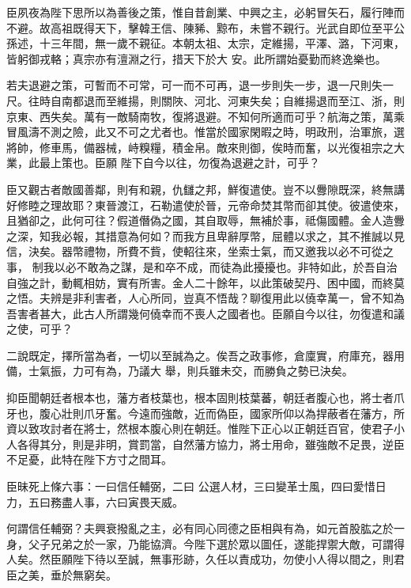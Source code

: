 \begin{pinyinscope}
 臣夙夜為陛下思所以為善後之策，惟自昔創業、中興之主，必躬冒矢石，履行陣而不避。故高祖既得天下，擊韓王信、陳豨、黥布，未嘗不親行。光武自即位至平公孫述，十三年間，無一歲不親征。本朝太祖、太宗，定維揚，平澤、潞，下河東，皆躬御戎輅；真宗亦有澶淵之行，措天下於大
 安。此所謂始憂勤而終逸樂也。



 若夫退避之策，可暫而不可常，可一而不可再，退一步則失一步，退一尺則失一尺。往時自南都退而至維揚，則關陜、河北、河東失矣；自維揚退而至江、浙，則京東、西失矣。萬有一敵騎南牧，復將退避。不知何所適而可乎？航海之策，萬乘冒風濤不測之險，此又不可之尤者也。惟當於國家閑暇之時，明政刑，治軍旅，選將帥，修車馬，備器械，峙糗糧，積金帛。敵來則御，俟時而奮，以光復祖宗之大業，此最上策也。臣願
 陛下自今以往，勿復為退避之計，可乎？



 臣又觀古者敵國善鄰，則有和親，仇讎之邦，鮮復遣使。豈不以釁隙既深，終無講好修睦之理故耶？東晉渡江，石勒遣使於晉，元帝命焚其幣而卻其使。彼遣使來，且猶卻之，此何可往？假道僭偽之國，其自取辱，無補於事，祗傷國體。金人造釁之深，知我必報，其措意為何如？而我方且卑辭厚幣，屈體以求之，其不推誠以見信，決矣。器幣禮物，所費不貲，使軺往來，坐索士氣，而又邀我以必不可從之事，
 制我以必不敢為之謀，是和卒不成，而徒為此擾擾也。非特如此，於吾自治自強之計，動輒相妨，實有所害。金人二十餘年，以此策破契丹、困中國，而終莫之悟。夫辨是非利害者，人心所同，豈真不悟哉？聊復用此以僥幸萬一，曾不知為吾害者甚大，此古人所謂幾何僥幸而不喪人之國者也。臣願自今以往，勿復遣和議之使，可乎？



 二說既定，擇所當為者，一切以至誠為之。俟吾之政事修，倉廩實，府庫充，器用備，士氣振，力可有為，乃議大
 舉，則兵雖未交，而勝負之勢已決矣。



 抑臣聞朝廷者根本也，藩方者枝葉也，根本固則枝葉蕃，朝廷者腹心也，將士者爪牙也，腹心壯則爪牙奮。今遠而強敵，近而偽臣，國家所仰以為捍蔽者在藩方，所資以致攻討者在將士，然根本腹心則在朝廷。惟陛下正心以正朝廷百官，使君子小人各得其分，則是非明，賞罰當，自然藩方協力，將士用命，雖強敵不足畏，逆臣不足憂，此特在陛下方寸之間耳。



 臣昧死上條六事：一曰信任輔弼，二曰
 公選人材，三曰變革士風，四曰愛惜日力，五曰務盡人事，六曰寅畏天威。



 何謂信任輔弼？夫興衰撥亂之主，必有同心同德之臣相與有為，如元首股肱之於一身，父子兄弟之於一家，乃能協濟。今陛下選於眾以圖任，遂能捍禦大敵，可謂得人矣。然臣願陛下待以至誠，無事形跡，久任以責成功，勿使小人得以間之，則君臣之美，垂於無窮矣。




\end{pinyinscope}
